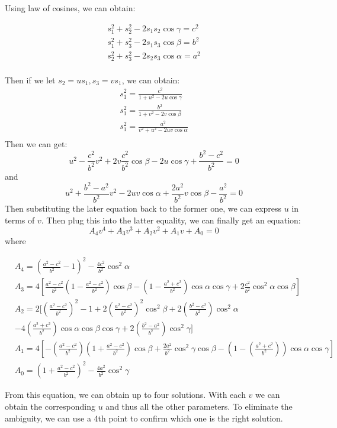 \documentclass[
]{book}
\theoremstyle{definition}
\theoremstyle{definition}
\theoremstyle{definition}
\theoremstyle{definition}
\theoremstyle{remark}
\begin{document}
Using law of cosines, we can obtain:

\begin{align}
  s_1^2 +s_2^2 - 2s_1s_2\cos\gamma = c^2\\
  s_1^2 +s_3^2 - 2s_1s_3\cos\beta = b^2\\
  s_2^2 +s_3^2 - 2s_2s_3\cos\alpha = a^2\\
\end{align}

Then if we let \(s_2 = us_1,s_3 = vs_1\), we can obtain:
\begin{align}
  s_1^2 = \frac{c^2}{1+u^2-2u\cos\gamma}\\
  s_1^2= \frac{b^2}{1+v^2-2v\cos\beta}\\
  s_1^2= \frac{a^2}{v^2+u^2-2uv\cos\alpha}\\
\end{align}
Then we can get:
\[
u^2-\frac{c^2}{b^2} v^2+2 v \frac{c^2}{b^2} \cos \beta-2 u \cos \gamma+\frac{b^2-c^2}{b^2}=0
\]
and
\[
u^2+\frac{b^2-a^2}{b^2} v^2-2 u v \cos \alpha+\frac{2 a^2}{b^2} v \cos \beta-\frac{a^2}{b^2}=0
\]
Then substituting the later equation back to the former one, we can express \(u\) in terms of \(v\). Then plug this into the latter equality, we can finally get an equation:
\[
A_4 v^4+A_3 v^3+A_2 v^2+A_1 v+A_0=0
\]
where

\begin{align}
& A_4=\left(\frac{a^2-c^2}{b^2}-1\right)^2-\frac{4 c^2}{b^2} \cos ^2 \alpha \\
& A_3=4\left[\frac{a^2-c^2}{b^2}\left(1-\frac{a^2-c^2}{b^2}\right) \cos \beta-\left(1-\frac{a^2+c^2}{b^2}\right) \cos \alpha \cos \gamma+2 \frac{c^2}{b^2} \cos ^2 \alpha \cos \beta\right] \\
& A_2=2[\left(\frac{a^2-c^2}{b^2}\right)^2-1+2\left(\frac{a^2-c^2}{b^2}\right)^2 \cos ^2 \beta+2\left(\frac{b^2-c^2}{b^2}\right) \cos ^2 \alpha \\
& -4\left(\frac{a^2+c^2}{b^2}\right) \cos \alpha \cos \beta \cos \gamma+2\left(\frac{b^2-a^2}{b^2}\right) \cos ^2 \gamma] \\
& A_1=4\left[-\left(\frac{a^2-c^2}{b^2}\right)\left(1+\frac{a^2-c^2}{b^2}\right) \cos \beta+\frac{2 a^2}{b^2} \cos ^2 \gamma \cos \beta-\left(1-\left(\frac{a^2+c^2}{b^2}\right)\right) \cos \alpha \cos \gamma\right] \\
& A_0=\left(1+\frac{a^2-c^2}{b^2}\right)^2-\frac{4 a^2}{b^2} \cos ^2 \gamma
\end{align}

From this equation, we can obtain up to four solutions. With each \(v\) we can obtain the corresponding \(u\) and thus all the other parameters. To eliminate the ambiguity, we can use a 4th point to confirm which one is the right solution.
\end{document}
